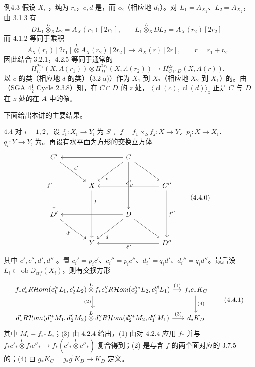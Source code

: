 \begin{SGAresult}{例}{4.3}
假设 $X_i$ ，纯为 $r_i$，$c,d$ 是，而 $c_2$（相应地 $d_1$）。对 $L_1=A_{X_1}$、$L_2=A_{X_2}$，由 3.1.3 有
\[DL_1\mathbin{\overset L\otimes}_SL_2=A_X(r_1)[2r_1],\qquad L_1\mathbin{\overset L\otimes}_SDL_2=A_X(r_2)[2r_2],\]
而 4.1.2 等同于乘积
\[A_X(r_1)[2r_1]\mathbin{\overset L\otimes}A_X(r_2)[2r_2]\longrightarrow A_X(r)[2r],\qquad r=r_1+r_2.\]
因此结合 3.2.1，4.2.5 等同于通常的
\[H_C^{2r_1}(X,A(r_1))\otimes H_D^{2r_2}(X,A(r_2))\longrightarrow H_{C\cap D}^{2r}(X,A(r)).\]
以 $c$ 的类（相应地 $d$ 的类）（3.2 a)）作为 $X_1$ 到 $X_2$（相应地 $X_2$ 到 $X_1$）的。由（SGA $4\frac12$ Cycle 2.3.8）知，在 $C\cap D$ 的 $z$ 处，
$\langle\operatorname{cl}(c),\operatorname{cl}(d)\rangle_z$ 正是 $C$ 与 $D$ 在 $z$ 处的在 $A$ 中的像。
\end{SGAresult}
下面给出本讲的主要结果。
\begin{SGAresult}{}{4.4}
对 $i=1,2$，设 $f_i:X_i\to Y_i$ 为 $S$ ，$f=f_1\times_Sf_2:X\to Y$，$p_i:X\to X_i$、$q_i:Y\to Y_i$ 为。再设有水平面为方形的交换立方体
\[\begin{tikzcd}[row sep=large,column sep=large]
C'\arrow[dd,"f'"']\arrow[dr,"c'"]&&C\arrow[ll]\arrow[dd,"g"]\arrow[dr]\arrow[dl,"c" near end]\\
&X\arrow[dd,"f" near start]&&C''\arrow[ll,"c''"']\arrow[dd,"f''"]\\
D'\arrow[dr,"d'"']&&D\arrow[ll]\arrow[dr]\arrow[dl,"d" near end]\\
&Y&&D''\arrow[ll,"d''"]
\end{tikzcd}\tag{4.4.0}\]
其中 $c',c'',d',d''$ 。置 $c_i'=p_ic'$、$c_i''=p_ic''$、$d_i'=q_id'$、$d_i''=q_id''$。最后设 $L_i\in\operatorname{ob}D_{ctf}(X_i)$。则有交换方形
\[\begin{tikzcd}[column sep=small]
f_*c'_*R\mathcal Hom(c_1'^*L_1,c_2'^!L_2)\mathbin{\overset L\otimes}f_*c''_*R\mathcal Hom(c_2''^*L_2,c_1''^!L_1)\arrow[r,"(1)"]\arrow[d,"(2)"']&f_*c_*K_C\arrow[d,"(4)"]\\
d'_*R\mathcal Hom(d_1'^*M_1,d_2'^!M_2)\mathbin{\overset L\otimes}d''_*R\mathcal Hom(d_2''^*M_2,d_1''^!M_1)\arrow[r,"(3)"]&d_*K_D
\end{tikzcd}\tag{4.4.1}\]
其中 $M_i=f_{i*}L_i$；(3) 由 4.2.4 给出，(1) 由对 4.2.4 应用 $f_*$ 并与 $f_*c'_*\mathbin{\overset L\otimes}f_*c''_*\to f_*(c'_*\mathbin{\overset L\otimes}c''_*)$ 复合得到；(2) 是与含 $f$ 的两个面对应的 3.7.5 的；(4) 由 $g_*K_C=g_*g^!K_D\to K_D$ 定义。
\end{SGAresult}
